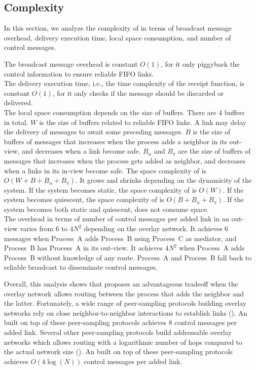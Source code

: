\subsection{Complexity}


In this section, we analyze the complexity of \RPCBROADCAST in terms of
broadcast message overhead, delivery execution time, local space consumption,
and number of control messages. 

The broadcast message overhead is constant $O(1)$, for it only piggyback the
control information to ensure reliable FIFO links. \\
The delivery execution time, i.e., the time complexity of the receipt function,
is constant $O(1)$, for it only checks if the message should be discarded or
delivered. \\
The local space consumption depends on the size of buffers. There are 4 buffers
in total. $W$ is the size of buffers related to reliable FIFO links. A link may
delay the delivery of messages to await some preceding messages. $B$ is the size
of buffers of messages that increases when the process adds a neighbor in its
out-view, and decreases when a link become safe. $B_\alpha$ and $B_\pi$ are the
size of buffers of messages that increases when the process gets added as
neighbor, and decreases when a links in its in-view become safe. The space
complexity of \RPCBROADCAST is $O(W + B + B_\alpha + B_\pi)$. It grows and
shrinks depending on the dynamicity of the system. If the system becomes static,
the space complexity of \RPCBROADCAST is $O(W)$. If the system becomes
quiescent, the space complexity of \RPCBROADCAST is $O(B + B_\alpha + B_\pi)$.
If the system becomes both static and quiescent, \RPCBROADCAST does not consume
space. \\
The overhead in terms of number of control messages per added link in an
out-view varies from $6$ to $4N^2$ depending on the overlay network. It achieves
$6$ messages when Process~A adds Process~B using Process~C as mediator, and
Process~B has Process~A in its out-view. It achieves $4N^2$ when Process~A adds
Process~B without knowledge of any route. Process~A and Process~B fall back to
reliable broadcast to disseminate control messages. 

Overall, this analysis shows that \RPCBROADCAST proposes an advantageous
tradeoff when the overlay network allows routing between the process that adds
the neighbor and the latter. Fortunately, a wide range of peer-sampling
protocols building overlay networks rely on close neighbor-to-neighbor
interactions to establish links (\REF). An \RPCBROADCAST built on top of these
peer-sampling protocols achieves $8$ control messages per added link. Several
other peer-sampling protocols build addressable overlay networks which allows
routing with a logarithmic number of hops compared to the actual network size
(\REF). An \RPCBROADCAST built on top of these peer-sampling protocols achieves
$O(4\log(N))$ control messages per added link.

